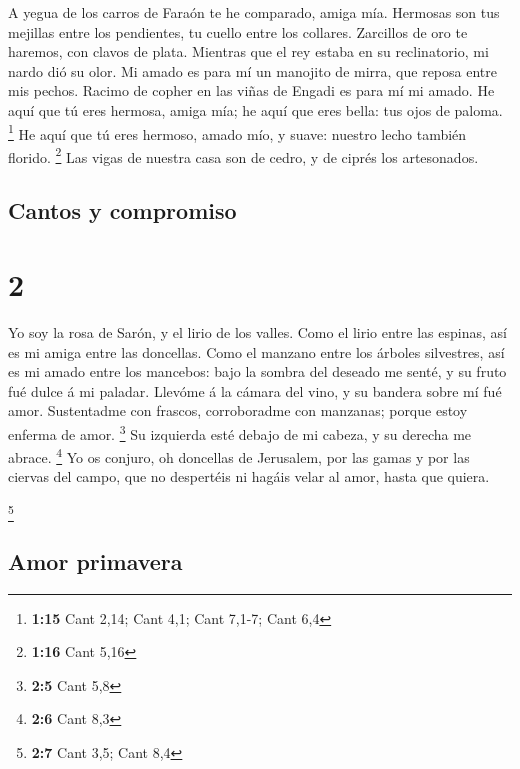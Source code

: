  A yegua de los carros de Faraón te he comparado, amiga mía.
 Hermosas son tus mejillas entre los pendientes, tu cuello
entre los collares.  Zarcillos de oro te haremos, con
clavos de plata.  Mientras que el rey estaba en su
reclinatorio, mi nardo dió su olor.  Mi amado es para mí un
manojito de mirra, que reposa entre mis pechos.  Racimo de
copher en las viñas de Engadi es para mí mi amado.  He aquí
que tú eres hermosa, amiga mía; he aquí que eres bella: tus ojos de
paloma. \footnote{\textbf{1:15} Cant 2,14; Cant 4,1; Cant 7,1-7; Cant
  6,4}  He aquí que tú eres hermoso, amado mío, y suave:
nuestro lecho también florido. \footnote{\textbf{1:16} Cant 5,16}
 Las vigas de nuestra casa son de cedro, y de ciprés los
artesonados.

\hypertarget{cantos-y-compromiso}{%
\subsection{Cantos y compromiso}\label{cantos-y-compromiso}}

\hypertarget{section-1}{%
\section{2}\label{section-1}}

 Yo soy la rosa de Sarón, y el lirio de los valles.
 Como el lirio entre las espinas, así es mi amiga entre las
doncellas.  Como el manzano entre los árboles silvestres,
así es mi amado entre los mancebos: bajo la sombra del deseado me senté,
y su fruto fué dulce á mi paladar.  Llevóme á la cámara del
vino, y su bandera sobre mí fué amor.  Sustentadme con
frascos, corroboradme con manzanas; porque estoy enferma de amor.
\footnote{\textbf{2:5} Cant 5,8}  Su izquierda esté debajo
de mi cabeza, y su derecha me abrace. \footnote{\textbf{2:6} Cant 8,3}
 Yo os conjuro, oh doncellas de Jerusalem, por las gamas y
por las ciervas del campo, que no despertéis ni hagáis velar al amor,
hasta que quiera.

\footnote{\textbf{2:7} Cant 3,5; Cant 8,4}

\hypertarget{amor-primavera}{%
\subsection{Amor primavera}\label{amor-primavera}}

